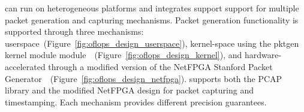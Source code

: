 \oflops can run on heterogeneous platforms and integrates support support for
multiple packet generation and capturing mechanisms.  Packet generation
functionality is supported through three mechanisms:
userspace~(Figure~\ref{fig:oflops_design_userspace}), kernel-space using the
pktgen kernel module
module~~(Figure~\ref{fig:oflops_design_kernel}), and
hardware-accelerated through a modified version of the NetFPGA Stanford Packet
Generator~~(Figure~\ref{fig:oflops_design_netfpga}).
\oflops supports both the PCAP library and the modified NetFPGA design for
packet capturing and timestamping. Each mechanism provides different precision
guarantees.

